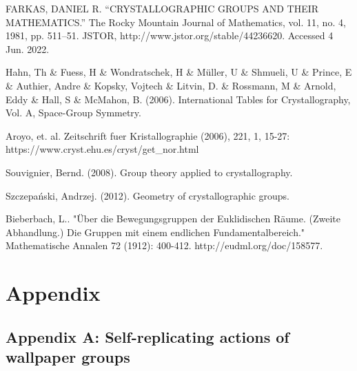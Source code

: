 \documentclass[a4paper,12pt]{amsart}
\theoremstyle{definition}
\begin{document}
\begin{thebibliography}{9}
				
		FARKAS, DANIEL R. “CRYSTALLOGRAPHIC GROUPS AND THEIR MATHEMATICS.” The Rocky Mountain Journal of Mathematics, vol. 11, no. 4, 1981, pp. 511–51. JSTOR, http://www.jstor.org/stable/44236620. Accessed 4 Jun. 2022.
		
		 Hahn, Th \& Fuess, H \& Wondratschek, H \& Müller, U \& Shmueli, U \& Prince, E \& Authier, Andre \& Kopsky, Vojtech \& Litvin, D. \& Rossmann, M \& Arnold, Eddy \& Hall, S \& McMahon, B. (2006). International Tables for Crystallography, Vol. A, Space-Group Symmetry. 
		
		 Aroyo, et. al. Zeitschrift fuer Kristallographie (2006), 221, 1, 15-27: https://www.cryst.ehu.es/cryst/get\_nor.html
		
		 Souvignier, Bernd. (2008). Group theory applied to crystallography. 
		
		 Szczepański, Andrzej. (2012). Geometry of crystallographic groups. 	
		
		Bieberbach, L.. "Über die Bewegungsgruppen der Euklidischen Räume. (Zweite Abhandlung.) Die Gruppen mit einem endlichen Fundamentalbereich." Mathematische Annalen 72 (1912): 400-412. http://eudml.org/doc/158577.
		
		
	\end{thebibliography}
	
	\newpage
	
	\section{Appendix}
	\subsection{Appendix A: Self-replicating actions of wallpaper groups}
	
\end{document}
